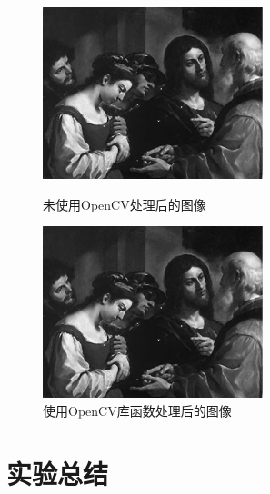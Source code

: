 \documentclass[a4paper]{ctexrep}
\begin{document}
\begin{figure}[h]
\centering
\begin{varwidth}[t]{\textwidth}
\vspace{0pt}
\includegraphics[height=5cm]{img/processedImage3.pdf}
\caption{未使用OpenCV处理后的图像}
\label{fig:firtProc}
\end{varwidth}%
\quad
\begin{varwidth}[t]{\textwidth}
\vspace{0pt}
\centering
\includegraphics[height=5cm]{img/processedImage4.pdf}
\caption{使用OpenCV库函数处理后的图像}
\label{fig:secondProc}
\end{varwidth}
\end{figure}

\section{实验总结}
\end{document}
